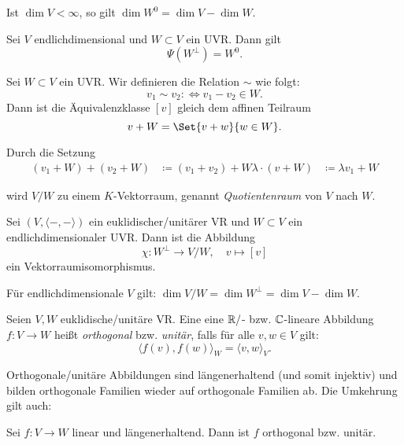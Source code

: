 \documentclass{cheat-sheet}
\begin{document}
\begin{bem}
Ist $\dim V < \infty$, so gilt $\dim W^0 = \dim V - \dim W$.
\end{bem}

\begin{satz}
Sei $V$ endlichdimensional und $W \subset V$ ein UVR. Dann gilt
\[ \Psi(W^{\perp}) = W^0. \]
\end{satz}

\begin{defn}
Sei $W \subset V$ ein UVR. Wir definieren die Relation $\sim$ wie folgt:
\[ v_1 \sim v_2 :\iff v_1 - v_2 \in W. \]
Dann ist die Äquivalenzklasse $[v]$ gleich dem affinen Teilraum
\[ v + W = \Set{ v + w }{ w \in W }. \]

Durch die Setzung
\begin{align*}
(v_1 + W) + (v_2 + W) &\coloneqq (v_1 + v_2) + W
\lambda \cdot (v + W) &\coloneqq \lambda v_1 + W
\end{align*}

wird $V/W$ zu einem $K$-Vektorraum, genannt \emph{Quotientenraum} von $V$ nach $W$.
\end{defn}

\begin{satz}
Sei $(V, \langle - , - \rangle)$ ein euklidischer/unitärer VR und $W \subset V$ ein endlichdimensionaler UVR. Dann ist die Abbildung
\[ \chi : W^{\perp} \to V/W, \quad v \mapsto [v] \]
ein Vektorraumisomorphismus.
\end{satz}

\begin{kor}
Für endlichdimensionale $V$ gilt: $\dim V/W = \dim W^{\perp} = \dim V - \dim W$.
\end{kor}

\begin{defn}
Seien $V, W$ euklidische/unitäre VR. Eine eine $\mathbb{R}/$- bzw. $\mathbb{C}$-lineare Abbildung $f : V \to W$ heißt \emph{orthogonal} bzw. \emph{unitär}, falls für alle $v, w \in V$ gilt:
\[ \langle f(v) , f(w) \rangle_W = \langle v , w \rangle_V. \]
\end{defn}

\begin{bem}
Orthogonale/unitäre Abbildungen sind längenerhaltend (und somit injektiv) und bilden orthogonale Familien wieder auf orthogonale Familien ab. Die Umkehrung gilt auch:
\end{bem}

\begin{satz}
Sei $f : V \to W$ linear und längenerhaltend. Dann ist $f$ orthogonal bzw. unitär.
\end{satz}
\end{document}
